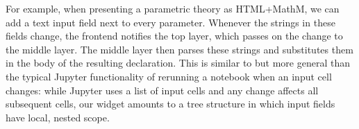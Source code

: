 For example, when presenting a parametric theory as HTML+MathM, we can add a text input field next to every parameter.
Whenever the strings in these fields change, the frontend notifies the top layer, which passes on the change to the middle layer.
The middle layer then parses these strings and substitutes them in the body of the resulting declaration.
This is similar to but more general than the typical Jupyter functionality of rerunning a notebook when an input cell changes: while Jupyter uses a list of input cells and any change affects all subsequent cells, our widget amounts to a tree structure in which input fields have local, nested scope.


